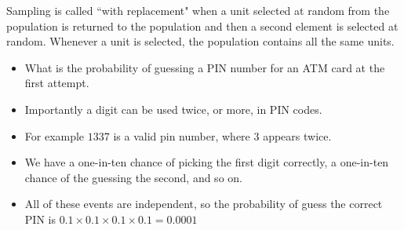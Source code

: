 \documentclass[a4paper,12pt]{article}
\begin{document}
Sampling is called ``with replacement" when a unit selected at random from the population is returned to the population and then a second element is selected at random. Whenever a unit is selected, the population contains all the same units.
\begin{itemize}
	\item What is the probability of guessing a PIN number for an ATM card at the first attempt.
	
	\item Importantly a digit can be used twice, or more, in PIN codes.
	
	\item For example $1337$ is a valid pin number, where $3$ appears twice.
	
	\item
	We have a one-in-ten chance of picking the first digit correctly, a one-in-ten chance of the guessing the second, and so on.
	
	\item All of these events are independent, so the probability of guess the correct PIN is $0.1 \times 0.1 \times 0.1 \times 0.1 = 0.0001$
\end{itemize}	
\end{document}
